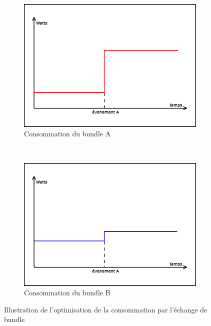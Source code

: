 \documentclass[a4paper, 11pt]{report}
\begin{document}
\begin{figure}
        \begin{subfigure}[b]{0.45\textwidth}
                \centering
                \includegraphics[width=\textwidth]{figures/Abstract_bundle_A.eps}
                \caption{Consommation du bundle A}
                \label{AbsBdlA}
        \end{subfigure}
        ~
        \begin{subfigure}[b]{0.45\textwidth}
                \centering
                \includegraphics[width=\textwidth]{figures/Abstract_bundle_B.eps}
                \caption{Consommation du bundle B}
                \label{AbsBdlB}
        \end{subfigure}
        \caption{Illustration de l’optimisation de la consommation par l’échange de bundle}
        \label{AbsBdl}
\end{figure}
\end{document}
